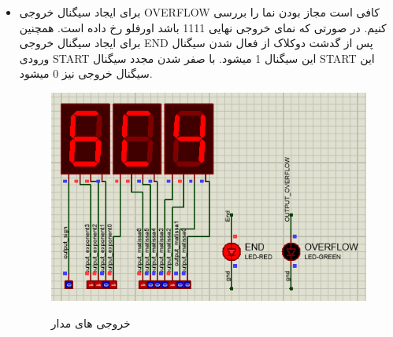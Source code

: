 \documentclass[twoside]{article}
\begin{document}
\begin{itemize}
	\item
	برای ایجاد سیگنال خروجی OVERFLOW کافی است مجاز بودن نما را بررسی کنیم. در صورتی که نمای خروجی نهایی 1111 باشد اورفلو رخ داده است. همچنین برای ایجاد سیگنال خروجی END پس از گدشت دوکلاک از فعال شدن سیگنال ورودی START این سیگنال 1 میشود. با صفر شدن مجدد سیگنال START این سیگنال خروجی نیز 0 میشود.
		\begin{figure}[h!]
			\begin{center}
				\includegraphics[scale=0.75]{outputs}‎
				\caption{خروجی های مدار}
			\end{center}
		\end{figure} 
		\newpage
	\end{itemize}
\end{document}
